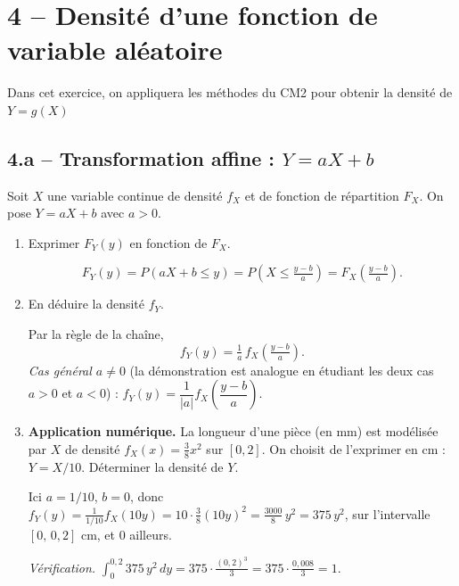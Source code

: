 \section*{4 -- Densité d'une fonction de variable aléatoire}

Dans cet exercice, on appliquera les
méthodes du CM2 pour obtenir la densité
de $Y=g(X)$ 

\subsection*{4.a -- Transformation affine : $Y=aX+b$}

Soit $X$ une variable continue de densité $f_X$ et de fonction
de répartition $F_X$. On pose $Y=aX+b$ avec $a>0$.

\begin{enumerate}
  \item Exprimer $F_Y(y)$ en fonction de $F_X$.
  \begin{solution}
    \[
      F_Y(y)=P(aX+b\le y)
      =P\!\left(X\le\tfrac{y-b}{a}\right)
      =F_X\!\left(\tfrac{y-b}{a}\right).
    \]
  \end{solution}

  \item En déduire la densité $f_Y$.
  \begin{solution}
    Par la règle de la chaîne,
    \[
      \boxed{\,f_Y(y)=\tfrac{1}{a}\,f_X\!\left(\tfrac{y-b}{a}\right).\,}
    \]
    \textit{Cas général $a\ne 0$} (la démonstration est analogue
    en étudiant les deux cas $a>0$ et $a<0$) :
    $f_Y(y)=\dfrac{1}{|a|}f_X\!\left(\dfrac{y-b}{a}\right)$.
  \end{solution}

  \item \textbf{Application numérique.}
  La longueur d'une pièce (en mm) est modélisée par $X$ de densité
  $f_X(x)=\tfrac{3}{8}x^2$ sur $[0,2]$. On choisit de l'exprimer en cm :
  $Y=X/10$. Déterminer la densité de $Y$.
  \begin{solution}
    Ici $a=1/10$, $b=0$, donc
    $f_Y(y)=\tfrac{1}{1/10}f_X(10y)=10\cdot\tfrac{3}{8}(10y)^2
    =\tfrac{3000}{8}\,y^2=375\,y^2$, sur l'intervalle $[0,\,0{,}2]$ cm,
    et $0$ ailleurs.

    \textit{Vérification.}
    $\int_0^{0{,}2}375\,y^2\,dy=375\cdot\tfrac{(0{,}2)^3}{3}
    =375\cdot\tfrac{0{,}008}{3}=1$. \checkmark
  \end{solution}
\end{enumerate}


